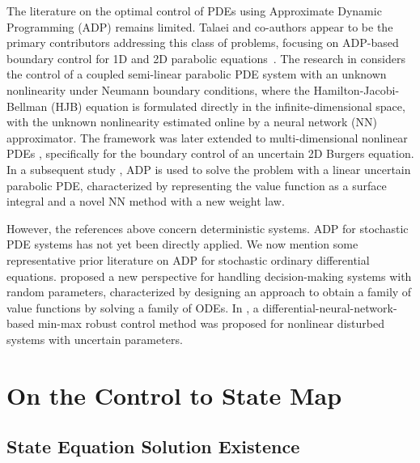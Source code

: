 \documentclass{article}
\newcommand{\1}{\mathds{1}}          %
\theoremstyle{definition}
\begin{document}
\begin{sloppypar}
The literature on the optimal control of PDEs using Approximate Dynamic Programming (ADP) remains limited. Talaei and co-authors appear to be the primary contributors addressing this class of problems, focusing on ADP-based boundary control for 1D and 2D parabolic equations~\cite{talaei2015adaptive,talaei2016boundary,talaei2017boundary}. The research in \cite{talaei2015adaptive} considers the control of a coupled semi-linear parabolic PDE system with an unknown nonlinearity under Neumann boundary conditions, where the Hamilton-Jacobi-Bellman (HJB) equation is formulated directly in the infinite-dimensional space, with the unknown nonlinearity estimated online by a neural network (NN) approximator. The framework was later extended to multi-dimensional nonlinear PDEs \cite{talaei2016boundary}, specifically for the boundary control of an uncertain 2D Burgers equation. In a subsequent study \cite{talaei2017boundary}, ADP is used to solve the problem with a linear uncertain parabolic PDE, characterized by representing the value function as a surface integral and a novel NN method with a new weight law. 


However, the references above concern deterministic systems. ADP for stochastic PDE systems has not yet been
directly applied.  We now mention some representative prior literature on ADP for stochastic ordinary differential equations. \cite{Busic2018} proposed a new perspective for handling decision-making systems with random parameters, characterized by designing an approach to obtain a family of value functions by solving a family of ODEs. In \cite{Poznyak2023}, a differential-neural-network-based min-max robust control method was proposed for nonlinear disturbed systems with uncertain parameters. 



\section{On the Control to State Map}

\subsection{State Equation Solution Existence}


\end{sloppypar}
\end{document}
